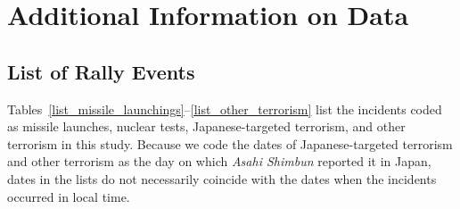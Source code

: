 \documentclass[12pt,letterpaper]{scrartcl}
\begin{document}
\section{Additional Information on Data}\label{app:sec:data}


\subsection{List of Rally Events}\label{app:subsec:events}


Tables~\ref{list_missile_launchings}--\ref{list_other_terrorism} list the incidents coded as missile launches, nuclear tests, Japanese-targeted terrorism, and other terrorism in this study. Because we code the dates of Japanese-targeted terrorism and other terrorism as the day on which \emph{Asahi Shimbun} reported it in Japan, dates in the lists do not necessarily coincide with the dates when the incidents occurred in local time.
\end{document}
